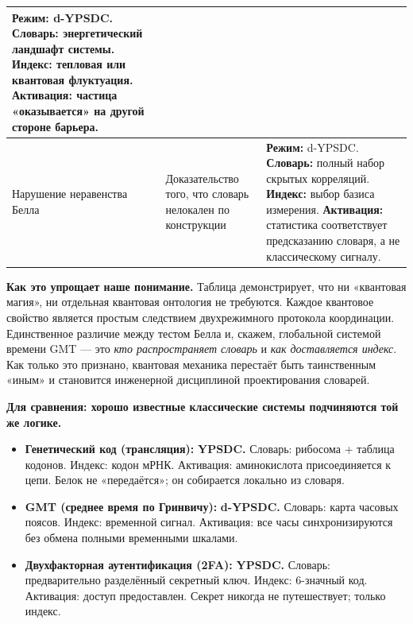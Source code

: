 \documentclass[12pt,a4paper]{article}
\theoremstyle{remark}
\begin{document}
\begin{table}[htbp]
\begin{tabular}{p{2.8cm} p{4.8cm} p{7.8cm}}
			\textbf{Режим:} d-YPSDC. \newline
			\textbf{Словарь:} энергетический ландшафт системы. \newline
			\textbf{Индекс:} тепловая или квантовая флуктуация. \newline
			\textbf{Активация:} частица «оказывается» на другой стороне барьера. \\
			\midrule
			Нарушение неравенства Белла &
			Доказательство того, что словарь нелокален по конструкции &
			\textbf{Режим:} d-YPSDC. \newline
			\textbf{Словарь:} полный набор скрытых корреляций. \newline
			\textbf{Индекс:} выбор базиса измерения. \newline
			\textbf{Активация:} статистика соответствует предсказанию словаря, а не классическому сигналу. \\
			\bottomrule
		\end{tabular}
	\end{table}
	
	\noindent
	\textbf{Как это упрощает наше понимание.}
	Таблица демонстрирует, что ни «квантовая магия», ни отдельная квантовая онтология не требуются. Каждое квантовое свойство является простым следствием двухрежимного протокола координации. Единственное различие между тестом Белла и, скажем, глобальной системой времени GMT — это \emph{кто распространяет словарь} и \emph{как доставляется индекс}. Как только это признано, квантовая механика перестаёт быть таинственным «иным» и становится инженерной дисциплиной проектирования словарей.
	
	\textbf{Для сравнения: хорошо известные классические системы подчиняются той же логике.}
	\begin{itemize}
		\item \textbf{Генетический код (трансляция):} \textbf{YPSDC.} Словарь: рибосома + таблица кодонов. Индекс: кодон мРНК. Активация: аминокислота присоединяется к цепи. Белок не «передаётся»; он собирается локально из словаря.
		\item \textbf{GMT (среднее время по Гринвичу):} \textbf{d-YPSDC.} Словарь: карта часовых поясов. Индекс: временной сигнал. Активация: все часы синхронизируются без обмена полными временными шкалами.
		\item \textbf{Двухфакторная аутентификация (2FA):} \textbf{YPSDC.} Словарь: предварительно разделённый секретный ключ. Индекс: 6-значный код. Активация: доступ предоставлен. Секрет никогда не путешествует; только индекс.
	\end{itemize}
	
\end{document}
